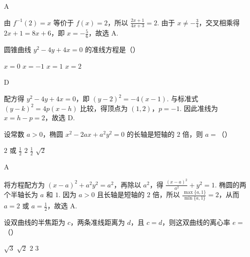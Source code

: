 \begin{answer}
A
\end{answer}

\begin{solution}
由 \(f^{-1}(2)=x\) 等价于 \(f(x)=2\)，所以
\(\frac{2x+1}{4x+3}=2\). 由于 \(x\neq-\frac{3}{4}\)，交叉相乘得 \(2x+1=8x+6\)，即 \(x=-\frac{5}{6}\)，故选 A.
\end{solution}

\begin{problem}

圆锥曲线 \(y^{2}-4y+4x=0 \) 的准线方程是（\quad）

\choices
{\(x=0\)}
{\(x=-1\)}
{\(x=1\)}
{\(x=2\)}
\end{problem}

\begin{answer}
D
\end{answer}

\begin{solution}
配方得 \(y^{2}-4y+4x=0\)，即 \((y-2)^{2}=-4(x-1)\). 与标准式 \((y-k)^{2}=4p(x-h)\) 比较，得顶点为 \((1,2)\)，\(p=-1\). 因此准线为 \(x=h-p=2\)，故选 D.
\end{solution}

\begin{problem}

设常数 \(a>0\)，椭圆 \(x^{2} - 2ax + a^{2}y^{2} = 0\) 的长轴是短轴的 \(2\) 倍，则 \(a=\)（\quad）

\choices
{\(2\) 或 \(\frac{1}{2}\)}
{\(2\)}
{\(\frac{1}{2}\)}
{\(\sqrt{2}\)}
\end{problem}

\begin{answer}
A
\end{answer}

\begin{solution}
将方程配方为 \((x-a)^{2}+a^{2}y^{2}=a^{2}\)，再除以 \(a^{2}\)，得
\(\frac{(x-a)^{2}}{a^{2}}+y^{2}=1\). 椭圆的两个半轴长为 \(a\) 和 \(1\). 因为 \(a>0\) 且长轴是短轴的 \(2\) 倍，所以
\(\frac{\max\{a,1\}}{\min\{a,1\}}=2\)，从而 \(a=2\) 或 \(a=\frac{1}{2}\)，故选 A.
\end{solution}

\begin{problem}

设双曲线的半焦距为 \(c\)，两条准线距离为 \(d\)，且 \(c=d\)，则这双曲线的离心率 \(e=\)（\quad）

\choices
{\(\sqrt{3}\)}
{\(\sqrt{2}\)}
{\(2\)}
{\(3\)}
\end{problem}

